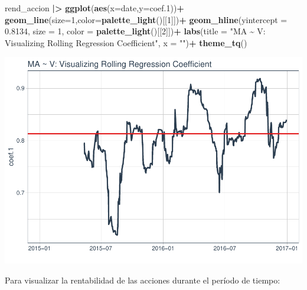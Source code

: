 \documentclass[
]{book}
\newenvironment{Shaded}{\begin{snugshade}}{\end{snugshade}}
\newcommand{\AttributeTok}[1]{\textcolor[rgb]{0.13,0.29,0.53}{#1}}
\newcommand{\DecValTok}[1]{\textcolor[rgb]{0.00,0.00,0.81}{#1}}
\newcommand{\FloatTok}[1]{\textcolor[rgb]{0.00,0.00,0.81}{#1}}
\newcommand{\FunctionTok}[1]{\textcolor[rgb]{0.13,0.29,0.53}{\textbf{#1}}}
\newcommand{\NormalTok}[1]{#1}
\newcommand{\SpecialCharTok}[1]{\textcolor[rgb]{0.81,0.36,0.00}{\textbf{#1}}}
\newcommand{\StringTok}[1]{\textcolor[rgb]{0.31,0.60,0.02}{#1}}
\begin{document}
\begin{Shaded}
\begin{Highlighting}[]
\NormalTok{rend\_accion }\SpecialCharTok{|\textgreater{}} \FunctionTok{ggplot}\NormalTok{(}\FunctionTok{aes}\NormalTok{(}\AttributeTok{x=}\NormalTok{date,}\AttributeTok{y=}\NormalTok{coef}\FloatTok{.1}\NormalTok{))}\SpecialCharTok{+}
                  \FunctionTok{geom\_line}\NormalTok{(}\AttributeTok{size=}\DecValTok{1}\NormalTok{,}\AttributeTok{color=}\FunctionTok{palette\_light}\NormalTok{()[[}\DecValTok{1}\NormalTok{]])}\SpecialCharTok{+}
                  \FunctionTok{geom\_hline}\NormalTok{(}\AttributeTok{yintercept =} \FloatTok{0.8134}\NormalTok{, }\AttributeTok{size =} \DecValTok{1}\NormalTok{, }\AttributeTok{color =} \FunctionTok{palette\_light}\NormalTok{()[[}\DecValTok{2}\NormalTok{]])}\SpecialCharTok{+}
                  \FunctionTok{labs}\NormalTok{(}\AttributeTok{title =} \StringTok{"MA \textasciitilde{} V: Visualizing Rolling Regression Coefficient"}\NormalTok{, }\AttributeTok{x =} \StringTok{""}\NormalTok{)}\SpecialCharTok{+}
                  \FunctionTok{theme\_tq}\NormalTok{()}
\end{Highlighting}
\end{Shaded}

\includegraphics{Libro_TidyQualityTools_files/figure-latex/unnamed-chunk-75-1.pdf}

Para visualizar la rentabilidad de las acciones durante el período de tiempo:
\end{document}
